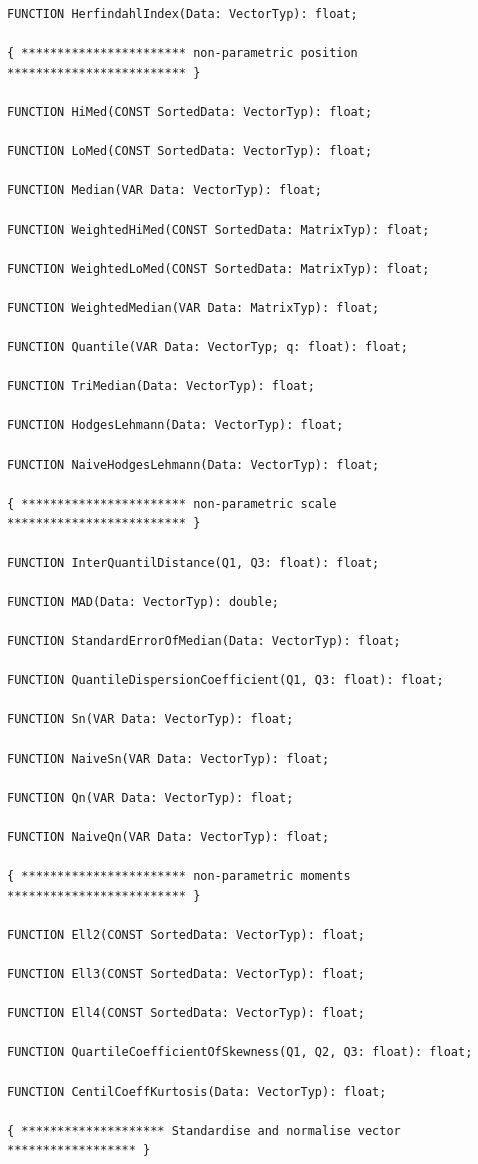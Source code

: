 \begin{refsection}
\begin{lstlisting}[caption=Interface of descript]
FUNCTION HerfindahlIndex(Data: VectorTyp): float;

{ *********************** non-parametric position ************************* }

FUNCTION HiMed(CONST SortedData: VectorTyp): float;

FUNCTION LoMed(CONST SortedData: VectorTyp): float;

FUNCTION Median(VAR Data: VectorTyp): float;

FUNCTION WeightedHiMed(CONST SortedData: MatrixTyp): float;

FUNCTION WeightedLoMed(CONST SortedData: MatrixTyp): float;

FUNCTION WeightedMedian(VAR Data: MatrixTyp): float;

FUNCTION Quantile(VAR Data: VectorTyp; q: float): float;

FUNCTION TriMedian(Data: VectorTyp): float;

FUNCTION HodgesLehmann(Data: VectorTyp): float;

FUNCTION NaiveHodgesLehmann(Data: VectorTyp): float;

{ *********************** non-parametric scale ************************* }

FUNCTION InterQuantilDistance(Q1, Q3: float): float;

FUNCTION MAD(Data: VectorTyp): double;

FUNCTION StandardErrorOfMedian(Data: VectorTyp): float;

FUNCTION QuantileDispersionCoefficient(Q1, Q3: float): float;

FUNCTION Sn(VAR Data: VectorTyp): float;

FUNCTION NaiveSn(VAR Data: VectorTyp): float;

FUNCTION Qn(VAR Data: VectorTyp): float;

FUNCTION NaiveQn(VAR Data: VectorTyp): float;

{ *********************** non-parametric moments ************************* }

FUNCTION Ell2(CONST SortedData: VectorTyp): float;

FUNCTION Ell3(CONST SortedData: VectorTyp): float;

FUNCTION Ell4(CONST SortedData: VectorTyp): float;

FUNCTION QuartileCoefficientOfSkewness(Q1, Q2, Q3: float): float;

FUNCTION CentilCoeffKurtosis(Data: VectorTyp): float;

{ ******************** Standardise and normalise vector ****************** }


\end{lstlisting}
\end{refsection}
